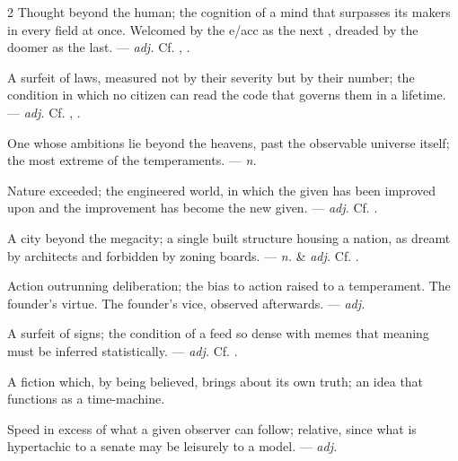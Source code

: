 \begin{multicols}{2}
 Thought beyond the human; the cognition of a mind that surpasses its makers in every field at once. Welcomed by the e/acc as the next , dreaded by the doomer as the last. —  \textit{adj.} Cf. , .

 A surfeit of laws, measured not by their severity but by their number; the condition in which no citizen can read the code that governs them in a lifetime. —  \textit{adj.} Cf. , .

 One whose ambitions lie beyond the heavens, past the observable universe itself; the most extreme of the  temperaments.  —  \textit{n.}

 Nature exceeded; the engineered world, in which the given has been improved upon and the improvement has become the new given. —  \textit{adj.} Cf. .

 A city beyond the megacity; a single built structure housing a nation, as dreamt by architects and forbidden by zoning boards. —  \textit{n.} \& \textit{adj.} Cf. .

 Action outrunning deliberation; the bias to action raised to a temperament.   The founder's virtue.   The founder's vice, observed afterwards. —  \textit{adj.}

 A surfeit of signs; the condition of a feed so dense with memes that meaning must be inferred statistically. —  \textit{adj.} Cf. .

 A fiction which, by being believed, brings about its own truth; an idea that functions as a time-machine.

 Speed in excess of what a given observer can follow; relative, since what is hypertachic to a senate may be leisurely to a model. —  \textit{adj.}


\end{multicols}
